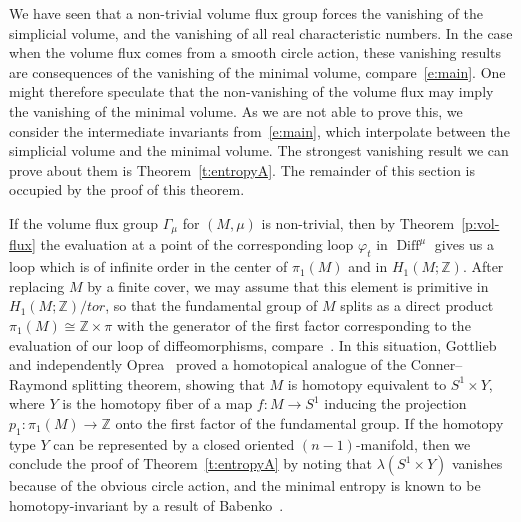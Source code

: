 \documentclass[12pt]{amsart}
\theoremstyle{definition}
\theoremstyle{remark}
\def\bZ{{\mathbb Z}}
\newcommand\Diff{\operatorname{Diff}}
\begin{document}
We have seen that a non-trivial volume flux group forces the vanishing of 
the simplicial volume, and the vanishing of all real characteristic numbers.
In the case when the volume flux comes from a smooth circle action,
these vanishing results are consequences of the vanishing of the minimal
volume, compare~\eqref{e:main}. One might therefore speculate that the non-vanishing of the 
volume flux may imply the vanishing of the minimal volume. As we are
not able to prove this, we consider the intermediate invariants from~\eqref{e:main},
which interpolate between the simplicial volume and the minimal volume.
The strongest vanishing result we can prove about them is Theorem~\ref{t:entropyA}.
The remainder of this section is occupied by the proof of this theorem.

If the volume flux group $\Gamma_{\mu}$ for $(M,\mu)$ is non-trivial, then 
    by Theorem~\ref{p:vol-flux} the evaluation at a point of the corresponding 
    loop $\varphi_t$ in $\Diff^{\mu}$ gives us a loop which is of infinite order 
    in the center of $\pi_{1}(M)$ and in $H_{1}(M;\bZ)$. After replacing $M$ by a  
    finite cover, we may assume that this element is primitive in $H_{1}(M;\bZ)/tor$, 
    so that the fundamental group of $M$ splits as a direct product 
    $\pi_{1}(M)\cong\bZ\times\pi$ with the generator of the first factor corresponding 
    to the evaluation of our loop of diffeomorphisms, compare~\cite{O}. In this situation, 
    Gottlieb~\cite{Gottlieb} and independently Oprea~\cite{O} proved a homotopical 
    analogue of the Conner--Raymond splitting theorem, showing that $M$ is 
    homotopy equivalent to $S^{1}\times Y$, where $Y$ is the homotopy fiber of a 
    map $f\colon M\rightarrow S^{1}$ inducing the projection 
    $p_{1}\colon\pi_{1}(M)\rightarrow\bZ$ onto the first factor of the fundamental group. 
    If the homotopy type $Y$ can be represented by a closed oriented $(n-1)$-manifold, 
    then we conclude the proof of Theorem~\ref{t:entropyA} by noting that $\lambda (S^{1}\times Y)$ 
    vanishes because of the obvious circle action, and the minimal entropy is known to be 
    homotopy-invariant by a result of Babenko~\cite{B1}.
    
\end{document}
